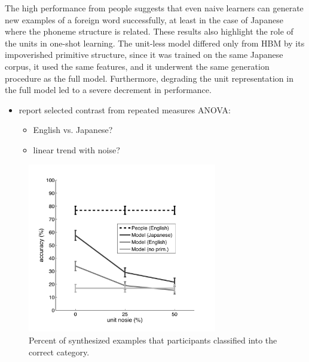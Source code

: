 \documentclass[10pt,letterpaper]{article}
\begin{document}
The high performance from people suggests that even naive learners can generate new examples of a foreign word successfully, at least in the case of Japanese where the phoneme structure is related. These results also highlight the role of the units in one-shot learning. The unit-less model differed only from HBM by its impoverished primitive structure, since it was trained on the same Japanese corpus, it used the same features, and it underwent the same generation procedure as the full model. Furthermore, degrading the unit representation in the full model led to a severe decrement in performance. 

\begin{itemize}
\item report selected contrast from repeated measures ANOVA:
	\begin{itemize}
	\item English vs. Japanese?
	\item linear trend with noise?
	\end{itemize}
\end{itemize}

\begin{figure}[h]
\centering
\includegraphics[width=3.25in]{gen_results.pdf}
\caption{Percent of synthesized examples that participants classified into the correct category.}
\label{gen_results}
\end{figure}
\end{document}
